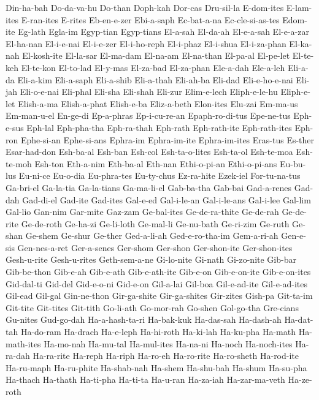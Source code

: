 {  Din-ha-bah Do-da-va-hu Do-than Doph-kah Dor-cas Dru-sil-la
  E-dom-ites E-lam-ites E-ran-ites E-rites Eb-en-e-zer Ebi-a-saph
  Ec-bat-a-na Ec-cle-si-as-tes Edom-ite Eg-lath Egla-im Egyp-tian
  Egyp-tians El-a-sah El-da-ah El-e-a-sah El-e-a-zar El-ha-nan
  El-i-e-nai El-i-e-zer El-i-ho-reph El-i-phaz El-i-shua El-i-za-phan
  El-ka-nah El-kosh-ite El-la-sar El-ma-dam El-na-am El-na-than
  El-pa-al El-pe-let El-te-keh El-te-kon El-to-lad El-y-mas
  El-za-bad El-za-phan Ele-a-dah Ele-a-leh Eli-a-da Eli-a-kim
  Eli-a-saph Eli-a-shib Eli-a-thah Eli-ah-ba Eli-dad Eli-e-ho-e-nai
  Eli-jah Eli-o-e-nai Eli-phal Eli-sha Eli-shah Eli-zur
  Elim-e-lech Eliph-e-le-hu Eliph-e-let Elish-a-ma Elish-a-phat Elish-e-ba
  Eliz-a-beth Elon-ites Elu-zai Em-ma-us Em-man-u-el En-ge-di
  Ep-a-phras Ep-i-cu-re-an Epaph-ro-di-tus Epe-ne-tus Eph-e-sus Eph-lal
  Eph-pha-tha Eph-ra-thah Eph-rath Eph-rath-ite Eph-rath-ites Eph-ron
  Ephe-si-an Ephe-si-ans Ephra-im Ephra-im-ite Ephra-im-ites Eras-tus
  Es-ther Esar-had-don Esh-ba-al Esh-ban Esh-col Esh-ta-o-lites
  Esh-ta-ol Esh-te-moa Esh-te-moh Esh-ton Eth-a-nim Eth-ba-al
  Eth-nan Ethi-o-pi-an Ethi-o-pi-ans Eu-bu-lus Eu-ni-ce Eu-o-dia
  Eu-phra-tes Eu-ty-chus Ez-ra-hite Ezek-iel For-tu-na-tus Ga-bri-el
  Ga-la-tia Ga-la-tians Ga-ma-li-el Gab-ba-tha Gab-bai Gad-a-renes
  Gad-dah Gad-di-el Gad-ite Gad-ites Gal-e-ed Gal-i-le-an
  Gal-i-le-ans Gal-i-lee Gal-lim Gal-lio Gan-nim Gar-mite
  Gaz-zam Ge-bal-ites Ge-de-ra-thite Ge-de-rah Ge-de-rite Ge-de-roth
  Ge-ha-zi Ge-li-loth Ge-mal-li Ge-nu-bath Ge-ri-zim Ge-ruth
  Ge-shan Ge-shem Ge-shur Ge-ther Ged-a-li-ah Ged-e-ro-tha-im
  Gem-a-ri-ah Gen-e-sis Gen-nes-a-ret Ger-a-senes Ger-shom Ger-shon
  Ger-shon-ite Ger-shon-ites Gesh-u-rite Gesh-u-rites Geth-sem-a-ne Gi-lo-nite
  Gi-nath Gi-zo-nite Gib-bar Gib-be-thon Gib-e-ah Gib-e-ath
  Gib-e-ath-ite Gib-e-on Gib-e-on-ite Gib-e-on-ites Gid-dal-ti Gid-del
  Gid-e-o-ni Gid-e-on Gil-a-lai Gil-boa Gil-e-ad-ite Gil-e-ad-ites
  Gil-ead Gil-gal Gin-ne-thon Gir-ga-shite Gir-ga-shites Gir-zites
  Gish-pa Git-ta-im Git-tite Git-tites Git-tith Go-li-ath
  Go-mor-rah Go-shen Gol-go-tha Gre-cians Gu-nites Gud-go-dah
  Ha-a-hash-ta-ri Ha-bak-kuk Ha-das-sah Ha-dash-ah Ha-dat-tah Ha-do-ram
  Ha-drach Ha-e-leph Ha-hi-roth Ha-ki-lah Ha-ku-pha Ha-math
  Ha-math-ites Ha-mo-nah Ha-mu-tal Ha-mul-ites Ha-na-ni Ha-noch
  Ha-noch-ites Ha-ra-dah Ha-ra-rite Ha-reph Ha-riph Ha-ro-eh
  Ha-ro-rite Ha-ro-sheth Ha-rod-ite Ha-ru-maph Ha-ru-phite Ha-shab-nah
  Ha-shem Ha-shu-bah Ha-shum Ha-su-pha Ha-thach Ha-thath
  Ha-ti-pha Ha-ti-ta Ha-u-ran Ha-za-iah Ha-zar-ma-veth Ha-ze-roth
}

